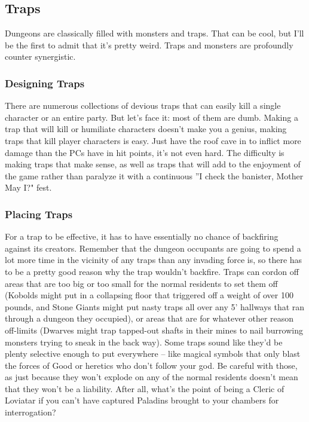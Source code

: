 \subsection{Traps}
\vspace*{-8pt}

Dungeons are classically filled with monsters and traps. That can be cool, but I'll be the first to admit that it's pretty weird. Traps and monsters are profoundly counter synergistic.

\subsubsection{Designing Traps}

There are numerous collections of devious traps that can easily kill a single character or an entire party. But let's face it: most of them are dumb. Making a trap that will kill or humiliate characters doesn't make you a genius, making traps that kill player characters is easy. Just have the roof cave in to inflict more damage than the PCs have in hit points, it's not even hard. The difficulty is making traps that make sense, as well as traps that will add to the enjoyment of the game rather than paralyze it with a continuous ''I check the banister, Mother May I?" fest.

\subsubsection{Placing Traps}

For a trap to be effective, it has to have essentially no chance of backfiring against its creators. Remember that the dungeon occupants are going to spend a lot more time in the vicinity of any traps than any invading force is, so there has to be a pretty good reason why the trap wouldn't backfire. Traps can cordon off areas that are too big or too small for the normal residents to set them off (Kobolds might put in a collapsing floor that triggered off a weight of over 100 pounds, and Stone Giants might put nasty traps all over any 5' hallways that ran through a dungeon they occupied), or areas that are for whatever other reason off-limits (Dwarves might trap tapped-out shafts in their mines to nail burrowing monsters trying to sneak in the back way). Some traps sound like they'd be plenty selective enough to put everywhere -- like magical symbols that only blast the forces of Good or heretics who don't follow your god. Be careful with those, as just because they won't explode on any of the normal residents doesn't mean that they won't be a liability. After all, what's the point of being a Cleric of Loviatar if you can't have captured Paladins brought to your chambers for interrogation?

